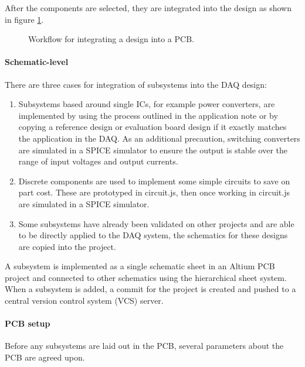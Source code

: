 \documentclass[a4paper,11pt]{article}
\begin{document}
After the components are selected, they are integrated into the design as shown in figure \ref{fig:implementation-workflow}.

\begin{figure}[H]
  \centering
  
  \caption{Workflow for integrating a design into a PCB.}
  \label{fig:implementation-workflow}
\end{figure}


\paragraph{Schematic-level}

There are three cases for integration of subsystems into the DAQ design:

\begin{enumerate}
  \item Subsystems based around single ICs, for example power converters, are implemented by using the process outlined in the  application note or by copying a reference design or evaluation board design if it exactly matches the application in the DAQ. As an additional precaution, switching converters are simulated in a SPICE simulator to ensure the output is stable over the range of input voltages and output currents.
  \item Discrete components are used to implement some simple circuits to save on part cost. These are prototyped in circuit.js, then once working in circuit.js are simulated in a SPICE simulator.
  \item Some subsystems have already been validated on other projects and are able to be directly applied to the DAQ system, the schematics for these designs are copied into the project.
\end{enumerate}

A subsystem is implemented as a single schematic sheet in an Altium PCB project and connected to other schematics using the hierarchical sheet system. When a subsystem is added, a commit for the project is created and pushed to a central version control system (VCS) server.

\paragraph{PCB setup}

Before any subsystems are laid out in the PCB, several parameters about the PCB are agreed upon.
\end{document}
